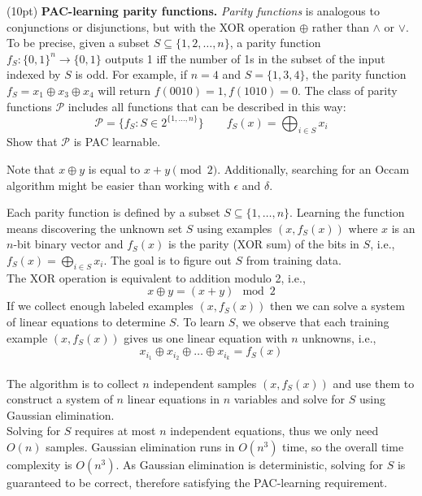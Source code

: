 \documentclass[11pt]{article}
\DeclareMathOperator{\1}{\mathbbm{1}}
\begin{document}
\begin{problem} (10pt) \textbf{PAC-learning parity functions.}
	\emph{Parity functions} is analogous to conjunctions or disjunctions, but with the XOR operation $\oplus$ rather than $\wedge$ or $\vee$. To be precise, given a subset $S \subseteq \{1, 2, \dots, n\}$, a parity function $f_S: \{0,1\}^n \to \{0,1\}$ outputs 1 iff the number of 1s in the subset of the input indexed by $S$ is odd. For example, if $n = 4$ and $S = \{1,3,4\}$, the parity function $f_S = x_1 \oplus x_3 \oplus x_4$ will return $f(0010) = 1, f(1010) = 0$. The class of parity functions $\mathcal{P}$ includes all functions that can be described in this way:
	\[ \mathcal{P} = \{f_S: S \in 2^{\{1,\dots,n\}}\} \qquad
	f_S(x) = \bigoplus_{i \in S}x_i \]
	Show that $\mathcal{P}$ is PAC learnable.
\end{problem}
\begin{hint}
	Note that $x \oplus y$ is equal to $x + y \pmod 2$. Additionally, searching for an Occam algorithm might be easier than working with $\epsilon$ and $\delta$.
\end{hint}
Each parity function is defined by a subset $S \subseteq \{1,\ldots,n\}$. Learning the function means discovering the unknown set $S$ using examples $(x, f_S(x))$ where $x$ is an $n$-bit binary vector and $f_S(x)$ is the parity (XOR sum) of the bits in $S$, i.e., $f_S(x) = \bigoplus_{i \in S}x_i$. The goal is to figure out $S$ from training data. \\
The XOR operation is equivalent to addition modulo 2, i.e., $$x \oplus y = (x + y) \mod 2$$ If we collect enough labeled examples $(x, f_S(x))$ then we can solve a system of linear equations to determine $S$. To learn $S$, we observe that each training example $(x, f_S(x))$ gives us one linear equation with $n$ unknowns, i.e., $$x_{i_1} \oplus x_{i_2} \oplus \ldots \oplus x_{i_k}=f_S(x)$$ \\
The algorithm is to collect $n$ independent samples $(x, f_S(x))$ and use them to construct a system of $n$ linear equations in $n$ variables and solve for $S$ using Gaussian elimination. \\
Solving for $S$ requires at most $n$ independent equations, thus we only need $O(n)$ samples. Gaussian elimination runs in $O(n^3)$ time, so the overall time complexity is $O(n^3)$. As Gaussian elimination is deterministic, solving for $S$ is guaranteed to be correct, therefore satisfying the PAC-learning requirement.
\end{document}
